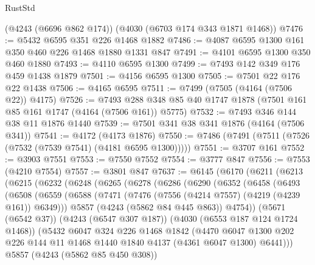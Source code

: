 \begin{lexlean}{RustStd}
\begin{coremodule}
    (@4243 (@6696 @862 @174))
    (@4030 (@6703 @174 @343 @1871 @1468))
@7476 := @5432 @6595 @351 @226 @1468 @1882
@7486 := @4087 @6595 @1300 @161 @350 @460 @226 @1468 @1880 @1331 @847
@7491 := @4101 @6595 @1300 @350 @460 @1880
@7493 := @4110 @6595 @1300
@7499 := @7493 @142 @349 @176 @459 @1438 @1879
@7501 := @4156 @6595 @1300
@7505 := @7501 @22 @176 @22 @1438
@7506 := @4165 @6595
@7511 := @7499 (@7505 (@4164 (@7506 @22)) @4175)
@7526 := @7493 @288 @348 @85 @40 @1747 @1878 (@7501 @161 @85 @161 @1747 (@4164 (@7506 @161)) @5775)
@7532 := @7493 @346 @144 @38 @11 @1876 @1440
@7539 := @7501 @341 @38 @341 @1876 (@4164 (@7506 @341))
@7541 := @4172 (@4173 @1876)
@7550 := @7486 (@7491 (@7511 (@7526 (@7532 (@7539 @7541) (@4181 @6595 @1300)))))
@7551 := @3707 @161
@7552 := @3903 @7551
@7553 := @7550 @7552
@7554 := @3777 @847
@7556 := @7553 (@4210 @7554)
@7557 := @3801 @847
@7637 := @6145
    (@6170
      (@6211
        (@6213
          (@6215
            (@6232
              (@6248
                (@6265
                  (@6278
                    (@6286
                      (@6290
                        (@6352
                          (@6458
                            (@6493
                              (@6508
                                (@6559
                                  (@6588
                                    (@7471 (@7476 (@7556 (@4214 @7557) (@4219 (@4239 @161)) @6349)))
                                    @5857
                                    (@4243 (@5862 @84 @445 @863))
                                    @4754))
                                (@5671 (@6542 @37))
                                (@4243 (@6547 @307 @187))
                                (@4030 (@6553 @187 @124 @1724 @1468))
                                (@5432
                                  @6047
                                  @324
                                  @226
                                  @1468
                                  @1842
                                  (@4470
                                    @6047
                                    @1300
                                    @202
                                    @226
                                    @144
                                    @11
                                    @1468
                                    @1440
                                    @1840
                                    @4137
                                    (@4361 @6047 @1300)
                                    @6441)))
                              @5857
                              (@4243 (@5862 @85 @450 @308))

\end{coremodule}
\end{lexlean}
